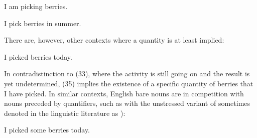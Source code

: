 
\item 

\label{bkm:Ref78699401}I am picking berries.


\item 

\label{bkm:Ref95014405}I pick berries in summer.



There are, however, other contexts where a quantity is at least implied:


\item 

\label{bkm:Ref78699451}I picked berries today. 



In contradistinction to (33), where the activity is still going on and the result is yet undetermined, (35) implies the existence of a specific quantity of berries that I have picked. In similar contexts, English bare nouns are in competition with nouns preceded by quantifiers, such as with the unstressed variant of  sometimes denoted in the linguistic literature as ):


\item 

I picked some berries today.

